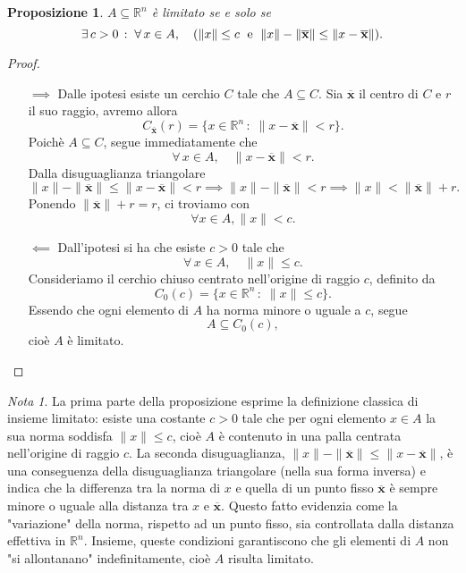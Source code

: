 \documentclass{article}
\theoremstyle{plain}
\newtheorem{prop}[thm]{Proposizione}
\theoremstyle{definition}
\theoremstyle{remark}
\newtheorem{note}{Nota}
\begin{document}
\begin{bxthm}
\begin{prop}
    $A\subseteq\mathbb{R}^n$ è limitato se e solo se 
    \[\exists\, c>0 \,:\;\forall\,x\in A,\quad(\|x\|\leq c\;\textup{ e }\; \| x \|-\| \overline{\mathbf{x}} \|\leq \| x-\overline{\mathbf{x}} \|).\]
\end{prop}
\end{bxthm}
\begin{proof}\hfill 
    \begin{itemize}
        \item[$\implies$] Dalle ipotesi esiste un cerchio $C$ tale che $A\subseteq C$. 
        Sia $\overline{\mathbf{x}}$ il centro di $C$ e $r$ il suo raggio, avremo allora 
        \[C_{\overline{\mathbf{x}}}(r)=\{x\in\mathbb{R}^n\,:\;\| x-\overline{\mathbf{x}} \|<r\}.\]
        Poichè $A\subseteq C$, segue immediatamente che 
        \[\forall\, x\in A,\quad \| x-\overline{\mathbf{x}} \|<r.\]
        Dalla disuguaglianza triangolare 
        \[\| x \| -\| \overline{\mathbf{x}} \|\leq\| x-\overline{\mathbf{x}} \|<r \implies \| x \|-\| \overline{\mathbf{x}} \|<r \implies \| x \|<\| \overline{\mathbf{x}} \|+r.\]
        Ponendo $\| \overline{\mathbf{x}} \|+r=r$, ci troviamo con 
        \[\forall x\in A, \| x \| < c.\]

        \item[$\impliedby$] Dall'ipotesi si ha che esiste $c>0$ tale che
        \[
        \forall\, x\in A,\quad \|x\|\leq c.
        \]
        Consideriamo il cerchio chiuso centrato nell'origine di raggio $c$, definito da
        \[
        C_{0}(c)=\{x\in\mathbb{R}^n\,:\; \|x\|\leq c\}.
        \]
        Essendo che ogni elemento di $A$ ha norma minore o uguale a $c$, segue 
        \[
        A\subseteq C_{0}(c),
        \]
        cioè $A$ è limitato.
    \end{itemize}
\end{proof}

\vspace{10pt}

\begin{note}
    La prima parte della proposizione esprime la definizione classica di insieme limitato: esiste una costante $c>0$ tale che per ogni elemento $x\in A$ 
    la sua norma soddisfa $\|x\|\leq c$, cioè $A$ è contenuto in una palla centrata nell'origine di raggio $c$. La seconda disuguaglianza, 
    $\|x\|-\| \overline{\mathbf{x}} \|\leq \| x-\overline{\mathbf{x}} \|$, è una conseguenza della disuguaglianza triangolare (nella sua forma inversa) e indica che la 
    differenza tra la norma di $x$ e quella di un punto fisso $\overline{\mathbf{x}}$ è sempre minore o uguale alla distanza tra $x$ e $\overline{\mathbf{x}}$. 
    Questo fatto evidenzia come la "variazione" della norma, rispetto ad un punto fisso, sia controllata dalla distanza effettiva in $\mathbb{R}^n$. 
    Insieme, queste condizioni garantiscono che gli elementi di $A$ non "si allontanano" indefinitamente, cioè $A$ risulta limitato.
\end{note}
\end{document}
